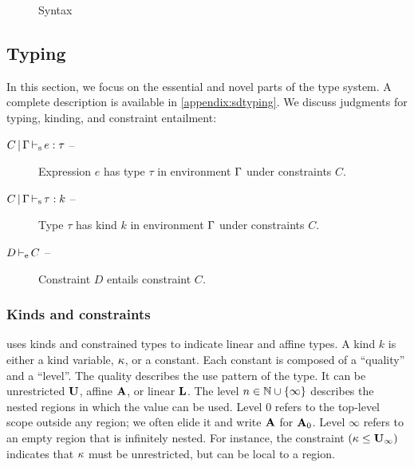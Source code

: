 
\begin{figure*}[!tb]
  \centering
  
  \caption{Syntax}
  \label{grammar}
\end{figure*}

\subsection{Typing}
\label{sdtyping}

In this section, we focus on the essential and novel parts of the type system. A complete
description is available in \cref{appendix:sdtyping}.
%
We discuss judgments for typing, kinding, and constraint entailment:
\begin{description}
\item[$C \operatorname{|} \Gamma \operatorname{\vdash_s} e : \tau$ --]
  Expression $e$ has type $\tau$ in environment $\Gamma$ under constraints $C$.
\item[$C \operatorname{|} \Gamma \operatorname{\vdash_s} \tau : k$ --]
  Type $\tau$ has kind $k$ in environment $\Gamma$ under constraints $C$.
\item[$D \operatorname{\vdash_e} C$ --] Constraint $D$ entails constraint $C$.
\end{description}

\subsubsection{Kinds and constraints}

\affe uses kinds and constrained types to indicate
linear and affine types.
A kind $k$ is either a kind variable, $\kappa$, or a constant.
Each constant is composed of a ``quality'' and a ``level''.
The quality describes the use pattern of the type. It can be
unrestricted $\mathbf{U}$, affine $\mathbf{A}$, or linear $\mathbf{L}$. The level  $n \in \mathbb{N} \cup \{\infty\}$
describes the nested regions in which the value can be used.
Level $0$ refers to the top-level scope outside any region; we often elide it
and write $\mathbf{A}$ for $\mathbf{A}_0$. Level
$\infty$ refers to an empty region that is infinitely nested.
For instance, the constraint $(\kappa \leq \mathbf{U}_\infty)$ indicates that
$\kappa$ must be unrestricted, but can be local to a region.


